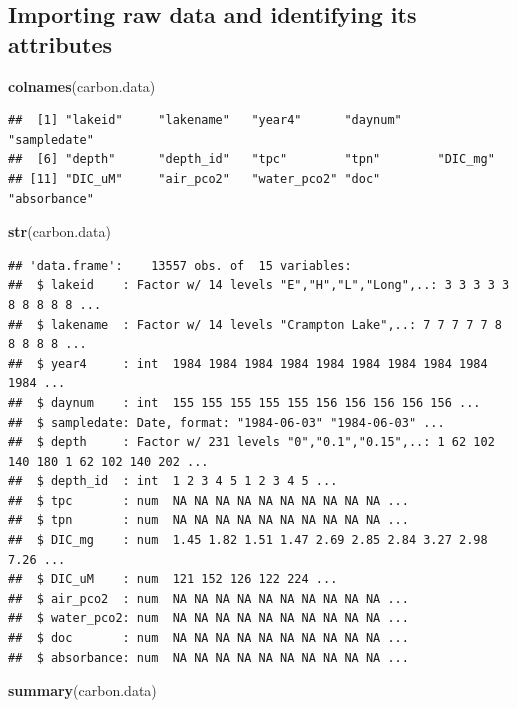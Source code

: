 \documentclass[12pt,]{article}
\newenvironment{Shaded}{\begin{snugshade}}{\end{snugshade}}
\newcommand{\KeywordTok}[1]{\textcolor[rgb]{0.13,0.29,0.53}{\textbf{#1}}}
\newcommand{\NormalTok}[1]{#1}
\begin{document}
\subsection{Importing raw data and identifying its
attributes}\label{importing-raw-data-and-identifying-its-attributes}

\begin{Shaded}
\begin{Highlighting}[]
\KeywordTok{colnames}\NormalTok{(carbon.data)}
\end{Highlighting}
\end{Shaded}

\begin{verbatim}
##  [1] "lakeid"     "lakename"   "year4"      "daynum"     "sampledate"
##  [6] "depth"      "depth_id"   "tpc"        "tpn"        "DIC_mg"    
## [11] "DIC_uM"     "air_pco2"   "water_pco2" "doc"        "absorbance"
\end{verbatim}

\begin{Shaded}
\begin{Highlighting}[]
\KeywordTok{str}\NormalTok{(carbon.data)}
\end{Highlighting}
\end{Shaded}

\begin{verbatim}
## 'data.frame':    13557 obs. of  15 variables:
##  $ lakeid    : Factor w/ 14 levels "E","H","L","Long",..: 3 3 3 3 3 8 8 8 8 8 ...
##  $ lakename  : Factor w/ 14 levels "Crampton Lake",..: 7 7 7 7 7 8 8 8 8 8 ...
##  $ year4     : int  1984 1984 1984 1984 1984 1984 1984 1984 1984 1984 ...
##  $ daynum    : int  155 155 155 155 155 156 156 156 156 156 ...
##  $ sampledate: Date, format: "1984-06-03" "1984-06-03" ...
##  $ depth     : Factor w/ 231 levels "0","0.1","0.15",..: 1 62 102 140 180 1 62 102 140 202 ...
##  $ depth_id  : int  1 2 3 4 5 1 2 3 4 5 ...
##  $ tpc       : num  NA NA NA NA NA NA NA NA NA NA ...
##  $ tpn       : num  NA NA NA NA NA NA NA NA NA NA ...
##  $ DIC_mg    : num  1.45 1.82 1.51 1.47 2.69 2.85 2.84 3.27 2.98 7.26 ...
##  $ DIC_uM    : num  121 152 126 122 224 ...
##  $ air_pco2  : num  NA NA NA NA NA NA NA NA NA NA ...
##  $ water_pco2: num  NA NA NA NA NA NA NA NA NA NA ...
##  $ doc       : num  NA NA NA NA NA NA NA NA NA NA ...
##  $ absorbance: num  NA NA NA NA NA NA NA NA NA NA ...
\end{verbatim}

\begin{Shaded}
\begin{Highlighting}[]
\KeywordTok{summary}\NormalTok{(carbon.data)}
\end{Highlighting}
\end{Shaded}
\end{document}
